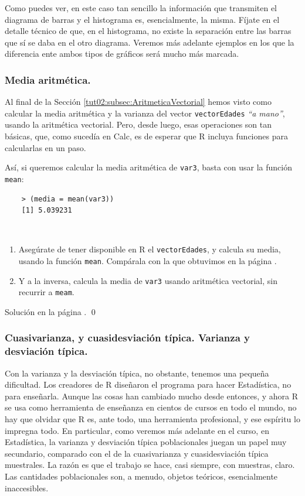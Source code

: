 \documentclass[10pt,a4paper]{article}\usepackage[]{graphicx}\usepackage[]{color}
\begin{document}
Como puedes ver, en este caso tan sencillo la información que transmiten el diagrama de barras y el histograma es, esencialmente, la misma. Fíjate en el detalle técnico de que, en el histograma, no existe la separación entre las barras que sí se daba en el otro diagrama. Veremos más adelante ejemplos en los que la diferencia ente ambos tipos de gráficos será mucho más marcada.

\subsubsection*{Media aritmética.}
\label{tut02:subsubsec:MediaAritmetica}

Al final de la Sección \ref{tut02:subsec:AritmeticaVectorial} hemos visto como calcular la media aritmética y la varianza del vector {\tt vectorEdades} {\em ``a mano''}, usando la aritmética vectorial. Pero, desde luego, esas operaciones son tan básicas, que, como sucedía en Calc, es de esperar que R incluya funciones para calcularlas en un paso.

Así, si queremos calcular la media aritmética de {\tt var3}, basta con usar la función {\tt mean}:
    \begin{verbatim}
    > (media = mean(var3))
    [1] 5.039231
    \end{verbatim}

\begin{ejercicio}
\label{tut02:ejercicio16}
\quad\\
\begin{enumerate}
  \item Asegúrate de tener disponible en R el {\tt vectorEdades}, y calcula su media, usando la función {\tt mean}.  Compárala con la que obtuvimos en la página \pageref{tut02:lugar:CalculoManualMediaAritmetica}.
  \item Y a la inversa, calcula la media de {\tt var3} usando aritmética vectorial, sin recurrir a {\tt meam}.
\end{enumerate}
Solución en la página \pageref{tut02:ejercicio16:sol}.  \qed
\end{ejercicio}

\subsubsection*{Cuasivarianza, y cuasidesviación típica. Varianza y desviación típica.}

Con la varianza y la desviación típica, no obstante, tenemos una pequeña dificultad. Los creadores de R diseñaron el programa para hacer Estadística, no para enseñarla. Aunque las cosas han cambiado mucho desde entonces, y ahora R se usa como herramienta de enseñanza en cientos de cursos en todo el mundo, no hay que olvidar que R es, ante todo, una herramienta profesional, y ese espíritu lo  impregna todo.  En particular, como veremos más adelante en el curso, en Estadística, la varianza y desviación típica poblacionales juegan un papel muy secundario, comparado con el de la cuasivarianza y cuasidesviación típica muestrales. La razón es que el trabajo se hace, casi siempre, con muestras, claro. Las cantidades poblacionales son, a menudo, objetos teóricos, esencialmente inaccesibles.
\end{document}

